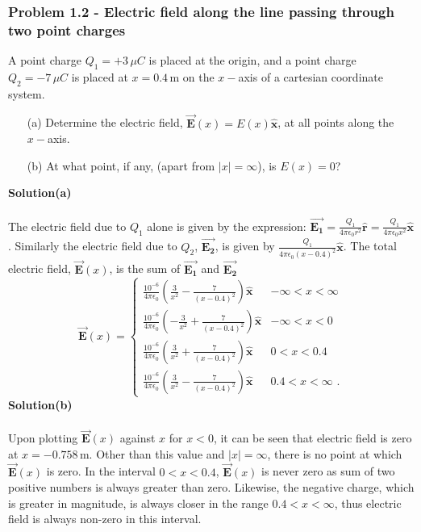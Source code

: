 \documentclass{article}
\begin{document}
\subsubsection*{Problem 1.2 - Electric field along the line passing through two point charges}
A point charge $Q_1=+3\,\mu C$ is placed at the origin, and a point charge $Q_2=-7\,\mu C$ is placed at $x=0.4$\,m on the $x-$axis of a cartesian coordinate system.
\begin{enumerate}
\item[(a)]Determine the electric field, $\Vec{\boldsymbol{E}}(x)=E(x)\boldsymbol{\hat{x}}$, at all points along the $x-$axis.
\item[(b)]At what point, if any, (apart from $|x|=\infty$), is $E(x)=0$?
\end{enumerate}
\textbf{Solution(a)}
\\
\\The electric field due to $Q_1$ alone is given by the expression: $\Vec{\boldsymbol{E_1}}=\frac{Q_1}{4\pi\epsilon_0r^2}\boldsymbol{\hat{r}}=\frac{Q_1}{4\pi\epsilon_0x^2}\boldsymbol{\hat{x}}$. Similarly the electric field due to $Q_2$, $\Vec{\boldsymbol{E_2}}$, is given by $\frac{Q_1}{4\pi\epsilon_0(x-0.4)^2}\boldsymbol{\hat{x}}$. The total electric field, $\Vec{\boldsymbol{E}}(x)$, is the sum of $\Vec{\boldsymbol{E_1}}$ and $\Vec{\boldsymbol{E_2}}$
\[\Vec{\boldsymbol{E}}(x)=\begin{cases}
    \frac{10^{-6}}{4\pi\epsilon_0}\left(\frac{3}{x^2}-\frac{7}{(x-0.4)^2}\right)\boldsymbol{\hat{x}}&-\infty<x<\infty
    \\\frac{10^{-6}}{4\pi\epsilon_0}\left(-\frac{3}{x^2}+\frac{7}{(x-0.4)^2}\right)\boldsymbol{\hat{x}}&-\infty<x<0
    \\\frac{10^{-6}}{4\pi\epsilon_0}\left(\frac{3}{x^2}+\frac{7}{(x-0.4)^2}\right)\boldsymbol{\hat{x}}&0<x<0.4
    \\\frac{10^{-6}}{4\pi\epsilon_0}\left(\frac{3}{x^2}-\frac{7}{(x-0.4)^2}\right)\boldsymbol{\hat{x}}&0.4<x<\infty\,\,.
\end{cases}\]
\textbf{Solution(b)}
\\
\\Upon plotting $\Vec{\boldsymbol{E}}(x)$ against $x$ for $x<0$, it can be seen that electric field is zero at $x=-0.758$\,m. Other than this value and $|x|=\infty$, there is no point at which $\Vec{\boldsymbol{E}}(x)$ is zero. In the interval $0<x<0.4$, $\Vec{\boldsymbol{E}}(x)$ is never zero as sum of two positive numbers is always greater than zero. Likewise, the negative charge, which is greater in magnitude, is always closer in the range $0.4<x<\infty$, thus electric field is always non-zero in this interval.
\end{document}
